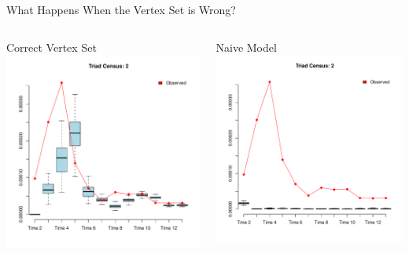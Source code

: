 \documentclass[10pt]{beamer}
\begin{document}
\begin{frame}{What Happens When the Vertex Set is Wrong?}
\begin{columns}
\begin{block}{\small{Correct Vertex Set}}
\includegraphics[width=.83\linewidth]{graphics/fixedVertexTriadCensus2}
\end{block}

\begin{block}{\small{Naive Model}}
\includegraphics[width=.83\linewidth]{graphics/simpleVertexTriadCensus2}
\end{block}

\end{columns}

\end{frame}
\end{document}
